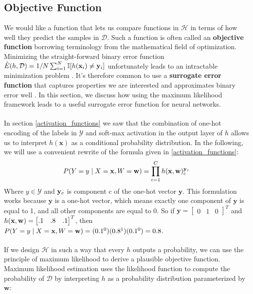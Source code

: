 \subsection{Objective Function}
\label{objectiveFunction}
We would like a function that lets us compare functions in $\mathcal{H}$ in terms of how well they predict the samples in $\mathcal{D}$. Such a function is often called an \textbf{objective function} borrowing terminology from the mathematical field of optimization. Minimizing the straight-forward binary error function $\hat{E}(h, \mathcal{D}) = 1/N \sum_{i=1}^N\mathbb{I}[h(\mathbf{x}_i) \neq \mathbf{y}_i]$ unfortunately leads to an intractable minimization problem \citep{marcotte1992}. It's therefore common to use a \textbf{surrogate error function} that captures properties we are interested and approximates binary error well \citep{goodfellow16}. In this section, we discuss how using the maximum likelihood framework leads to a useful surrogate error function for neural networks.
\\\\
In section \ref{activation_functions} we saw that the combination of one-hot encoding of the labels in $\mathcal{Y}$ and soft-max activation in the output layer of $h$ allows us to interpret $h(\mathbf{x})$ as a conditional probability distribution. In the following, we will use a convenient rewrite of the formula given in \ref{activation_functions}:
$$
P(Y = y \mid X = \mathbf{x}, W = \mathbf{w}) = \prod\limits_{c=1}^C h(\mathbf{x},\mathbf{w})^{\mathbf{y}_c}_c
$$
Where $y \in \mathcal{Y}$ and $\mathbf{y}_c$ is component c of the one-hot vector $\mathbf{y}$. 
This formulation works because $\mathbf{y}$ is a one-hot vector, which means exactly one component of $\mathbf{y}$ is equal to 1, and all other components are equal to 0. So if $\mathbf{y} = \begin{bmatrix}0 & 1 & 0 \end{bmatrix}^T$ and $h(\mathbf{x}, \mathbf{w}) = \begin{bmatrix}.1 & .8 & .1 \end{bmatrix}^T$, then $P(Y = y \mid X = \mathbf{x}, W = \mathbf{w}) = (0.1^0)(0.8^1)(0.1^0) = 0.8$.
\\\\
If we design $\mathcal{H}$ in such a way that every $h$ outputs a probability, we can use the principle of maximum likelihood to derive a plausible objective function. Maximum likelihood estimation uses the likelihood function to compute the probability of $\mathcal{D}$ by interpreting $h$ as a probability distribution parameterized by $\mathbf{w}$:

